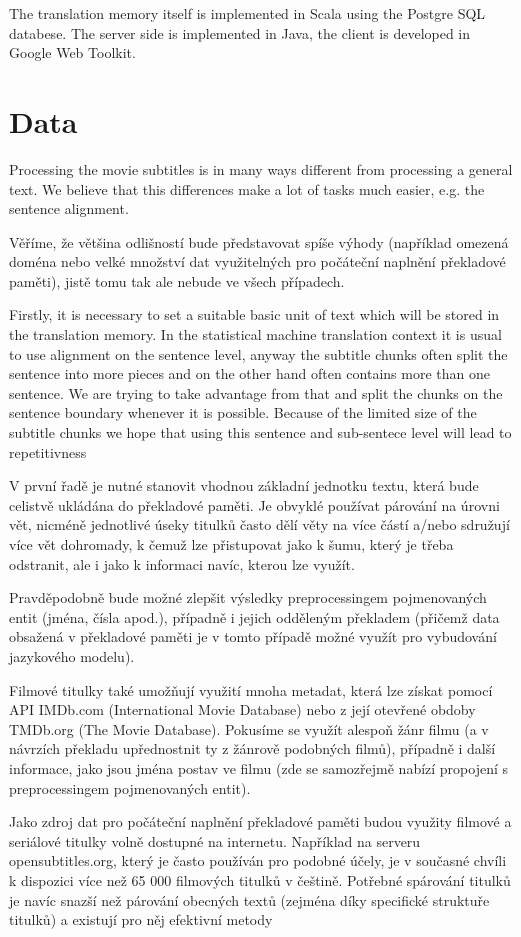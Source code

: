 The translation memory itself is implemented in Scala using the Postgre SQL databese. The server side is implemented in Java, the client is developed in Google Web Toolkit.

\section{Data}

Processing the movie subtitles is in many ways different from processing a general text. We believe that this differences make a lot of tasks much easier, e.g. the sentence alignment.

Věříme, že většina odlišností bude představovat spíše výhody (například omezená doména nebo velké množství dat využitelných pro počáteční naplnění překladové paměti), jistě tomu tak ale nebude ve všech případech.

Firstly, it is necessary to set a suitable basic unit of text which will be stored in the translation memory. In the statistical machine translation context it is usual to use alignment on the sentence level, anyway the subtitle chunks often split the sentence into more pieces and on the other hand often contains more than one sentence. We are trying to take advantage from that and split the chunks on the sentence boundary whenever it is possible. Because of the limited size of the subtitle chunks we hope that using this sentence and sub-sentece level will lead to repetitivness

V první řadě je nutné stanovit vhodnou základní jednotku textu, která bude celistvě ukládána do překladové paměti. Je obvyklé používat párování na úrovni vět, nicméně jednotlivé úseky titulků často dělí věty na více částí a/nebo sdružují více vět dohromady, k čemuž lze přistupovat jako k šumu, který je třeba odstranit, ale i jako k informaci navíc, kterou lze využít.

Pravděpodobně bude možné zlepšit výsledky preprocessingem pojmenovaných entit (jména, čísla apod.), případně i jejich odděleným překladem (přičemž data obsažená v překladové paměti je v tomto případě možné využít pro vybudování jazykového modelu).

Filmové titulky také umožňují využití mnoha metadat, která lze získat pomocí API IMDb.com (International Movie Database) nebo z její otevřené obdoby TMDb.org (The Movie Database). Pokusíme se využít alespoň žánr filmu (a v návrzích překladu upřednostnit ty z žánrově podobných filmů), případně i další informace, jako jsou jména postav ve filmu (zde se samozřejmě nabízí propojení s preprocessingem pojmenovaných entit).

Jako zdroj dat pro počáteční naplnění překladové paměti budou využity filmové a seriálové titulky volně dostupné na internetu. Například na serveru    opensubtitles.org, který je často používán pro podobné účely, je v současné chvíli k dispozici více než 65 000 filmových titulků v češtině. Potřebné spárování titulků je navíc snazší než párování obecných textů (zejména díky specifické struktuře titulků) a existují pro něj efektivní metody